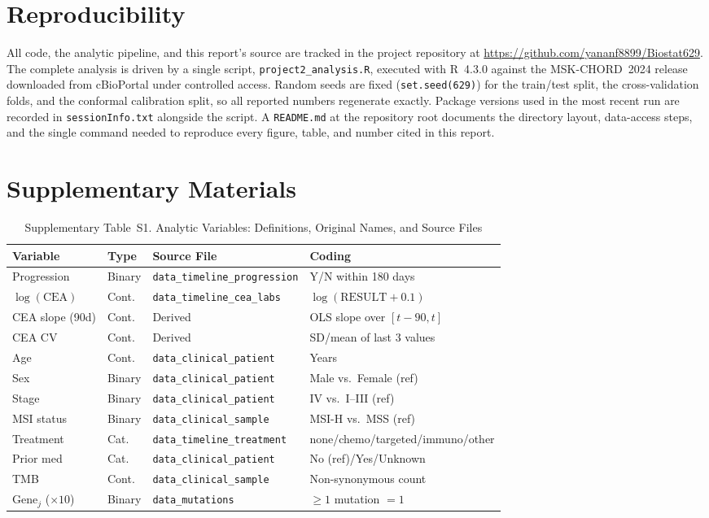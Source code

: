 \documentclass[11pt]{article}
\begin{document}
\section*{Reproducibility}

All code, the analytic pipeline, and this report's source are tracked in the project repository at \url{https://github.com/yananf8899/Biostat629}. The complete analysis is driven by a single script, \texttt{project2\_analysis.R}, executed with R~4.3.0 against the MSK-CHORD~2024 release downloaded from cBioPortal under controlled access. Random seeds are fixed (\texttt{set.seed(629)}) for the train/test split, the cross-validation folds, and the conformal calibration split, so all reported numbers regenerate exactly. Package versions used in the most recent run are recorded in \texttt{sessionInfo.txt} alongside the script. A \texttt{README.md} at the repository root documents the directory layout, data-access steps, and the single command needed to reproduce every figure, table, and number cited in this report.

\appendix
\section*{Supplementary Materials}

\begin{table}[H]
\centering
\caption{Supplementary Table~S1. Analytic Variables: Definitions, Original Names, and Source Files}
\label{tab:variables}
\small
\begin{tabular}{llll}
\toprule
Variable & Type & Source File & Coding \\
\midrule
Progression & Binary & \texttt{data\_timeline\_progression} & Y/N within 180 days \\
$\log(\text{CEA})$ & Cont. & \texttt{data\_timeline\_cea\_labs} & $\log(\text{RESULT} + 0.1)$ \\
CEA slope (90d) & Cont. & Derived & OLS slope over $[t-90, t]$ \\
CEA CV & Cont. & Derived & SD/mean of last 3 values \\
Age & Cont. & \texttt{data\_clinical\_patient} & Years \\
Sex & Binary & \texttt{data\_clinical\_patient} & Male vs.\ Female (ref) \\
Stage & Binary & \texttt{data\_clinical\_patient} & IV vs.\ I--III (ref) \\
MSI status & Binary & \texttt{data\_clinical\_sample} & MSI-H vs.\ MSS (ref) \\
Treatment & Cat. & \texttt{data\_timeline\_treatment} & none/chemo/targeted/immuno/other \\
Prior med & Cat. & \texttt{data\_clinical\_patient} & No (ref)/Yes/Unknown \\
TMB & Cont. & \texttt{data\_clinical\_sample} & Non-synonymous count \\
Gene$_j$ ($\times 10$) & Binary & \texttt{data\_mutations} & $\geq 1$ mutation $= 1$ \\
\bottomrule
\end{tabular}
\end{table}
\end{document}
